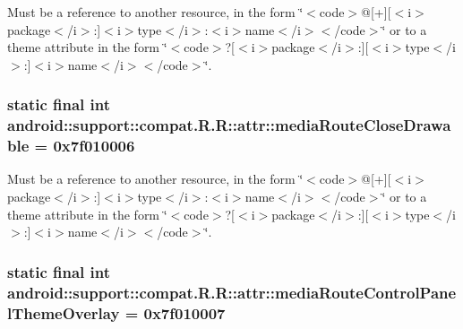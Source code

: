 Must be a reference to another resource, in the form \char`\"{}$<$code$>$@\mbox{[}+\mbox{]}\mbox{[}$<$i$>$package$<$/i$>$:\mbox{]}$<$i$>$type$<$/i$>$:$<$i$>$name$<$/i$>$$<$/code$>$\char`\"{} or to a theme attribute in the form \char`\"{}$<$code$>$?\mbox{[}$<$i$>$package$<$/i$>$:\mbox{]}\mbox{[}$<$i$>$type$<$/i$>$:\mbox{]}$<$i$>$name$<$/i$>$$<$/code$>$\char`\"{}. \hypertarget{classandroid_1_1support_1_1compat_1_1_r_1_1attr_efa6535c608bc6b7a2cecb82735db3a5}{
\subsubsection[{mediaRouteCloseDrawable}]{\setlength{\rightskip}{0pt plus 5cm}static final int android::support::compat.R.R::attr::mediaRouteCloseDrawable = 0x7f010006}}
\label{classandroid_1_1support_1_1compat_1_1_r_1_1attr_efa6535c608bc6b7a2cecb82735db3a5}


Must be a reference to another resource, in the form \char`\"{}$<$code$>$@\mbox{[}+\mbox{]}\mbox{[}$<$i$>$package$<$/i$>$:\mbox{]}$<$i$>$type$<$/i$>$:$<$i$>$name$<$/i$>$$<$/code$>$\char`\"{} or to a theme attribute in the form \char`\"{}$<$code$>$?\mbox{[}$<$i$>$package$<$/i$>$:\mbox{]}\mbox{[}$<$i$>$type$<$/i$>$:\mbox{]}$<$i$>$name$<$/i$>$$<$/code$>$\char`\"{}. \hypertarget{classandroid_1_1support_1_1compat_1_1_r_1_1attr_5913462240f2151f44f553ae603d4b91}{
\subsubsection[{mediaRouteControlPanelThemeOverlay}]{\setlength{\rightskip}{0pt plus 5cm}static final int android::support::compat.R.R::attr::mediaRouteControlPanelThemeOverlay = 0x7f010007}}
\label{classandroid_1_1support_1_1compat_1_1_r_1_1attr_5913462240f2151f44f553ae603d4b91}


